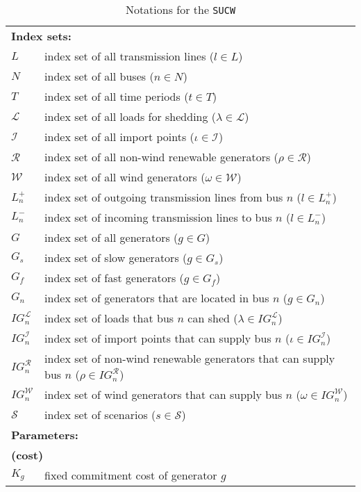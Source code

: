 \begin{table}[H]
	\centering
	\caption{Notations for the \texttt{SUCW}}
	\label{sucw:notation}
	\begin{tabular}{ll}
		\toprule
		\multicolumn{2}{l}{\textbf{Index sets:}} \\
		$L$ & index set of all transmission lines ($l\in L$) \\
		$N$ & index set of all buses ($n\in N$)\\
		$T$ & index set of all time periods ($t\in T$)\\
		$\mathcal{L}$ & index set of all loads for shedding ($\lambda \in \mathcal{L}$)\\
		$\mathcal{I}$ & index set of all import points ($\iota\in \mathcal{I}$)\\
		$\mathcal{R}$ & index set of all non-wind renewable generators ($\rho\in \mathcal{R}$)\\
		$\mathcal{W}$ & index set of all wind generators ($\omega\in \mathcal{W}$)\\
		$L_n^{+}$ & index set of outgoing transmission lines from bus $n$ ($l\in L_n^+$)\\
		$L_n^{-}$ & index set of incoming transmission lines to bus $n$ ($l\in L_n^-$)\\
		$G$ & index set of all generators ($g\in G$)\\
		$G_s$ & index set of slow generators ($g\in G_s$)\\
		$G_f$ & index set of fast generators ($g\in G_f$)\\
		$G_n$ & index set of generators that are located in bus $n$ ($g\in G_n$)\\
		$IG_n^\mathcal{L}$ & index set of loads that bus $n$ can shed ($\lambda\in IG_n^\mathcal{L}$)\\
		$IG_n^\mathcal{I}$ & index set of import points that can supply bus $n$ ($\iota\in IG_n^\mathcal{I}$) \\
		$IG_n^\mathcal{R}$ & index set of non-wind renewable generators that can supply bus $n$ ($\rho\in IG_n^\mathcal{R}$) \\
		$IG_n^\mathcal{W}$ & index set of wind generators that can supply bus $n$ ($\omega\in IG_n^\mathcal{W}$)\\
		$\mathcal{S}$ & index set of scenarios ($s\in\mathcal{S}$) 		\\  \midrule
		\multicolumn{2}{l}{\textbf{Parameters:}} \\
		\multicolumn{2}{l}{\textbf{(cost)}} \\
		$K_g$ & fixed commitment cost of generator $g$ \\

\end{tabular}
\end{table}
